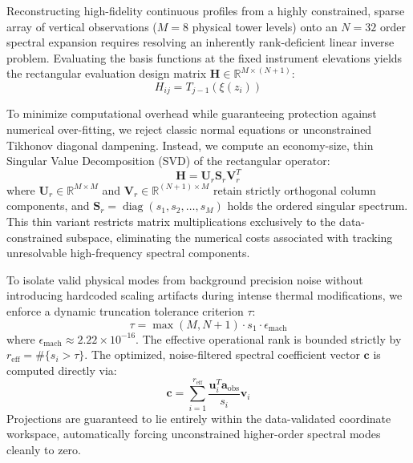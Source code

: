 Reconstructing high-fidelity continuous profiles from a highly constrained, sparse array of vertical observations ($M = 8$ physical tower levels) onto an $N=32$ order spectral expansion requires resolving an inherently rank-deficient linear inverse problem. Evaluating the basis functions at the fixed instrument elevations yields the rectangular evaluation design matrix $\mathbf{H} \in \mathbb{R}^{M \times (N+1)}$:
\begin{equation}
H_{ij} = T_{j-1}(\xi(z_i))
\label{eq:h_matrix_def}
\end{equation}

To minimize computational overhead while guaranteeing protection against numerical over-fitting, we reject classic normal equations or unconstrained Tikhonov diagonal dampening. Instead, we compute an economy-size, thin Singular Value Decomposition (SVD) of the rectangular operator:
\begin{equation}
\mathbf{H} = \mathbf{U}_r \mathbf{S}_r \mathbf{V}_r^T
\label{eq:thin_svd}
\end{equation}
where $\mathbf{U}_r \in \mathbb{R}^{M \times M}$ and $\mathbf{V}_r \in \mathbb{R}^{(N+1) \times M}$ retain strictly orthogonal column components, and $\mathbf{S}_r = \operatorname{diag}(s_1, s_2, \ldots, s_M)$ holds the ordered singular spectrum. This thin variant restricts matrix multiplications exclusively to the data-constrained subspace, eliminating the numerical costs associated with tracking unresolvable high-frequency spectral components.

To isolate valid physical modes from background precision noise without introducing hardcoded scaling artifacts during intense thermal modifications, we enforce a dynamic truncation tolerance criterion $\tau$:
\begin{equation}
\tau = \max\left(M, N+1\right) \cdot s_1 \cdot \epsilon_{\mathrm{mach}}
\label{eq:dynamic_tolerance}
\end{equation}
where $\epsilon_{\mathrm{mach}} \approx 2.22 \times 10^{-16}$. The effective operational rank is bounded strictly by $r_{\mathrm{eff}} = \#\{s_i > \tau\}$. The optimized, noise-filtered spectral coefficient vector $\mathbf{c}$ is computed directly via:
\begin{equation}
\mathbf{c} = \sum_{i=1}^{r_{\mathrm{eff}}} \frac{\mathbf{u}_i^T \mathbf{a}_{\mathrm{obs}}}{s_i} \mathbf{v}_i
\label{eq:svd_reconstruction}
\end{equation}
Projections are guaranteed to lie entirely within the data-validated coordinate workspace, automatically forcing unconstrained higher-order spectral modes cleanly to zero.

